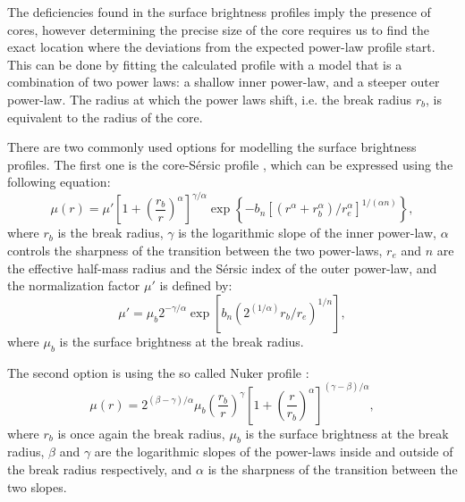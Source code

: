 \documentclass[english, oneside]{HYgradu}
\begin{document}
The deficiencies found in the surface brightness profiles imply the presence of cores, however determining the precise size of the core requires us to find the exact location where the deviations from the expected power-law profile start. This can be done by fitting the calculated profile with a model that is a combination of two power laws: a shallow inner power-law, and a steeper outer power-law. The radius at which the power laws shift, i.e. the break radius $r_b$, is equivalent to the radius of the core. 

There are two commonly used options for modelling the surface brightness profiles. The first one is the core-Sérsic profile \citep{Graham2003}, which can be expressed using the following equation:
\begin{equation}
\mu(r) = \mu' \left[ 1 + \left( \frac{r_b}{r} \right)^\alpha \right]^{\gamma / \alpha} \exp \left\lbrace -b_n \left[ \left( r^\alpha + r_b^\alpha \right) / r_e^\alpha \right]^{1/(\alpha n)} \right\rbrace, \label{eq:core-sersic}
\end{equation}
where $r_b$ is the break radius, $\gamma$ is the logarithmic slope of the inner power-law, $\alpha$ controls the sharpness of the transition between the two power-laws, $r_e$ and $n$ are the effective half-mass radius and the Sérsic index of the outer power-law, and the normalization factor $\mu'$ is defined by:
\begin{equation}
\mu' = \mu_b 2^{-\gamma/\alpha} \exp \left[ b_n \left( 2^(1/\alpha) r_b/r_e \right)^{1/n} \right], 
\label{eq:mu_dot}
\end{equation}
where $\mu_b$ is the surface brightness at the break radius. 

The second option is using the so called Nuker profile \citep{Lauer1995}:
\begin{equation}
\mu(r) = 2^{(\beta - \gamma) / \alpha} \mu_b \left( \frac{r_b}{r} \right)^\gamma \left[ 1 + \left( \frac{r}{r_b} \right)^\alpha \right]^{(\gamma - \beta)/\alpha},
\label{eq:nuker}
\end{equation}
where $r_b$ is once again the break radius, $\mu_b$ is the surface brightness at the break radius, $\beta$ and $\gamma$ are the logarithmic slopes of the power-laws inside and outside of the break radius respectively, and $\alpha$ is the sharpness of the transition between the two slopes.
\end{document}
